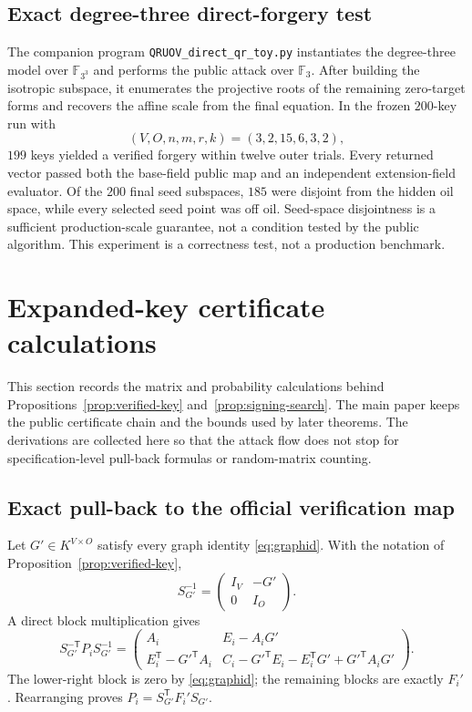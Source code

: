 \documentclass[11pt,a4paper]{article}
\theoremstyle{definition}
\theoremstyle{remark}
\newcommand{\F}{\mathbb F}
\begin{document}
\subsection{Exact degree-three direct-forgery test}

The companion program \texttt{QRUOV\_direct\_qr\_toy.py} instantiates the
degree-three model over $\F_{3^3}$ and performs the public attack over $\F_3$.
After building the isotropic subspace, it enumerates the projective roots of
the remaining zero-target forms and recovers the affine scale from the final
equation.  In the frozen $200$-key run with
\[
 (V,O,n,m,r,k)=(3,2,15,6,3,2),
\]
$199$ keys yielded a verified forgery within twelve outer trials.  Every
returned vector passed both the base-field public map and an independent
extension-field evaluator.  Of the $200$ final seed subspaces, $185$ were
disjoint from the hidden oil space, while every selected seed point was off
oil.  Seed-space disjointness is a sufficient production-scale guarantee, not
a condition tested by the public algorithm.  This experiment is a correctness
test, not a production benchmark.

\section{Expanded-key certificate calculations}\label{app:expanded-certificates}

This section records the matrix and probability calculations behind
Propositions~\ref{prop:verified-key} and~\ref{prop:signing-search}.  The main paper keeps the public
certificate chain and the bounds used by later theorems.  The derivations are
collected here so that the attack flow does not stop for specification-level
pull-back formulas or random-matrix counting.

\subsection{Exact pull-back to the official verification map}

Let $G'\in K^{V\times O}$ satisfy every graph identity
\eqref{eq:graphid}.  With the notation of Proposition~\ref{prop:verified-key},
\[
 S_{G'}^{-1}=\begin{pmatrix}I_V&-G'\\0&I_O\end{pmatrix}.
\]
A direct block multiplication gives
\[
S_{G'}^{-\mathsf T}P_iS_{G'}^{-1}
=
\begin{pmatrix}
A_i&E_i-A_iG'\\
E_i^{\mathsf T}-{G'}^{\mathsf T}A_i&
C_i-{G'}^{\mathsf T}E_i-E_i^{\mathsf T}G'+{G'}^{\mathsf T}A_iG'
\end{pmatrix}.
\]
The lower-right block is zero by \eqref{eq:graphid}; the remaining blocks are
exactly $F_i'$.  Rearranging proves
$P_i=S_{G'}^{\mathsf T}F_i'S_{G'}$.
\end{document}
